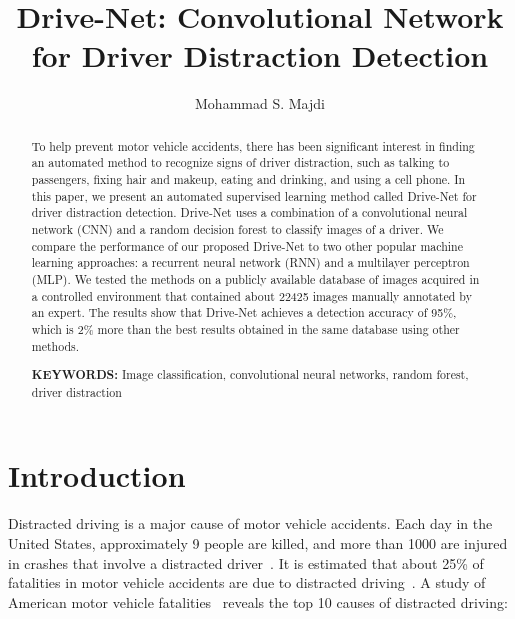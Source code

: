 \documentclass[conference,compsoc]{IEEEtran}
\begin{document}
\title{Drive-Net: Convolutional Network for Driver Distraction Detection}
\author{Mohammad S. Majdi}

\maketitle

\begin{abstract}
%
To help prevent motor vehicle accidents, there has been significant interest in finding an automated method to recognize signs of driver distraction, such as talking to passengers, fixing hair and makeup, eating and drinking, and using a cell phone. In this paper, we present an automated supervised learning method called Drive-Net for driver distraction detection. Drive-Net uses a combination of a convolutional neural network (CNN) and a random decision forest to classify images of a driver. We compare the performance of our proposed Drive-Net to two other popular machine learning approaches: a recurrent neural network (RNN) and a multilayer perceptron (MLP). We tested the methods on a publicly available database of images acquired in a controlled environment that contained about 22425 images manually annotated by an expert. The results show that Drive-Net achieves a detection accuracy of 95\%, which is 2\% more than the best results obtained in the same database using other methods.

\textbf{KEYWORDS:}
%
Image classification, convolutional neural networks, random forest, driver distraction
\end{abstract}

%

\section{Introduction}
Distracted driving is a major cause of motor vehicle accidents. Each day in the United States, approximately 9 people are killed, and more than 1000 are injured in crashes that involve a distracted driver~\cite{schroeder_National_2018}. It is estimated that about 25\% of fatalities in motor vehicle accidents are due to distracted driving~\cite{website_insurer_2013}. A study of American motor vehicle fatalities~\cite{schroeder_National_2018} reveals the top 10 causes of distracted driving:
\end{document}
